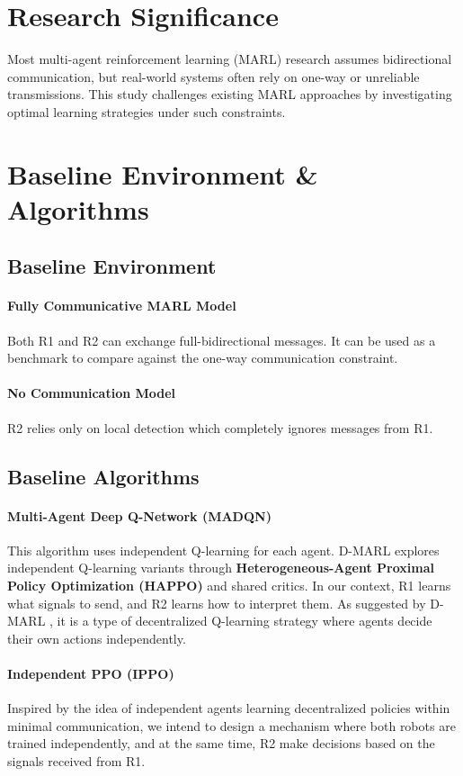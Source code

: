 \documentclass[a4paper,11pt]{article}
\begin{document}
\section{Research Significance} 

Most multi-agent reinforcement learning (MARL) research assumes bidirectional communication, but real-world systems often rely on one-way or unreliable transmissions. This study challenges existing MARL approaches by investigating optimal learning strategies under such constraints.

\section{Baseline Environment \& Algorithms}

\subsection{Baseline Environment} 
\paragraph{Fully Communicative MARL Model} Both R1 and R2 can exchange full-bidirectional messages. It can be used as a benchmark to compare against the one-way communication constraint.

\paragraph{No Communication Model} R2 relies only on local detection which completely ignores messages from R1.

\subsection{Baseline Algorithms} 
\paragraph{Multi-Agent Deep Q-Network (MADQN)} This algorithm uses independent Q-learning for each agent. D-MARL \cite{D-MARL} explores independent Q-learning variants through \textbf{Heterogeneous-Agent Proximal Policy Optimization (HAPPO)} and shared critics.  In our context, R1 learns what signals to send, and R2 learns how to interpret them.
As suggested by D-MARL \cite{D-MARL}, it is a type of decentralized Q-learning strategy where agents decide their own actions independently.

\paragraph{Independent PPO (IPPO)} Inspired by the idea of independent agents \cite{D-MARL} learning decentralized policies within minimal communication, we intend to design a mechanism where both robots are trained independently, and at the same time, R2 make decisions based on the signals received from R1.
\end{document}
